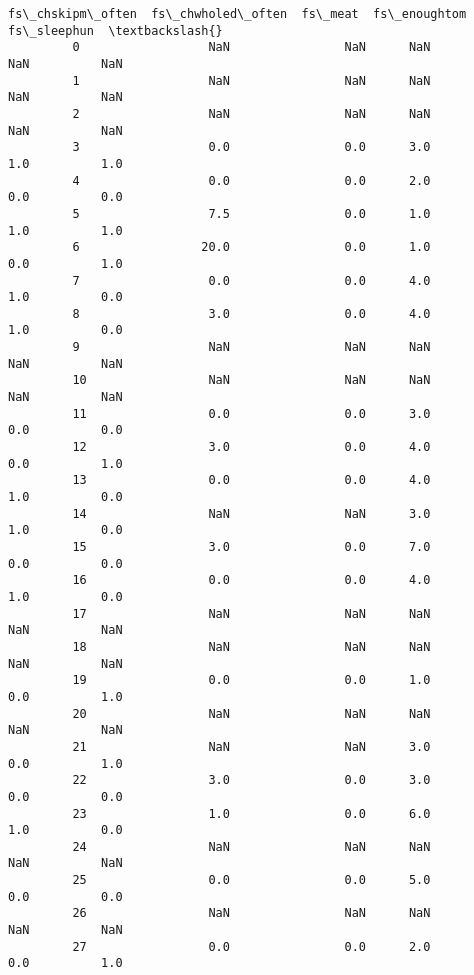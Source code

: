 \documentclass[11pt]{article}
\begin{document}
\begin{Verbatim}[commandchars=\\\{\}]
               fs\_chskipm\_often  fs\_chwholed\_often  fs\_meat  fs\_enoughtom  fs\_sleephun  \textbackslash{}
         0                  NaN                NaN      NaN           NaN          NaN   
         1                  NaN                NaN      NaN           NaN          NaN   
         2                  NaN                NaN      NaN           NaN          NaN   
         3                  0.0                0.0      3.0           1.0          1.0   
         4                  0.0                0.0      2.0           0.0          0.0   
         5                  7.5                0.0      1.0           1.0          1.0   
         6                 20.0                0.0      1.0           0.0          1.0   
         7                  0.0                0.0      4.0           1.0          0.0   
         8                  3.0                0.0      4.0           1.0          0.0   
         9                  NaN                NaN      NaN           NaN          NaN   
         10                 NaN                NaN      NaN           NaN          NaN   
         11                 0.0                0.0      3.0           0.0          0.0   
         12                 3.0                0.0      4.0           0.0          1.0   
         13                 0.0                0.0      4.0           1.0          0.0   
         14                 NaN                NaN      3.0           1.0          0.0   
         15                 3.0                0.0      7.0           0.0          0.0   
         16                 0.0                0.0      4.0           1.0          0.0   
         17                 NaN                NaN      NaN           NaN          NaN   
         18                 NaN                NaN      NaN           NaN          NaN   
         19                 0.0                0.0      1.0           0.0          1.0   
         20                 NaN                NaN      NaN           NaN          NaN   
         21                 NaN                NaN      3.0           0.0          1.0   
         22                 3.0                0.0      3.0           0.0          0.0   
         23                 1.0                0.0      6.0           1.0          0.0   
         24                 NaN                NaN      NaN           NaN          NaN   
         25                 0.0                0.0      5.0           0.0          0.0   
         26                 NaN                NaN      NaN           NaN          NaN   
         27                 0.0                0.0      2.0           0.0          1.0   

\end{Verbatim}
\end{document}
